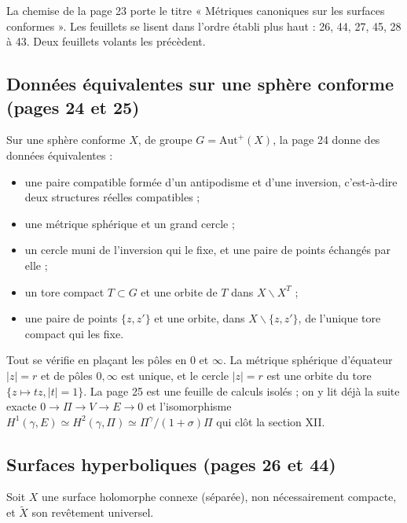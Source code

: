 \documentclass[11pt,a4paper]{article}
\begin{document}
La chemise de la page 23 porte le titre « Métriques canoniques sur les
surfaces conformes ». Les feuillets se lisent dans l'ordre établi plus haut :
26, 44, 27, 45, 28 à 43. Deux feuillets volants les précèdent.

\subsection*{Données équivalentes sur une sphère conforme (pages 24 et 25)}

Sur une sphère conforme $X$, de groupe $G = \mathrm{Aut}^{+}(X)$, la page 24
donne des données équivalentes :

\begin{itemize}
  \item[a)] une paire compatible formée d'un antipodisme et d'une
  inversion, c'est-à-dire deux structures réelles compatibles ;
  \item[b)] une métrique sphérique et un grand cercle ;
  \item[c)] un cercle muni de l'inversion qui le fixe, et une paire de points
  échangés par elle ;
  \item[d)] un tore compact $T \subset G$ et une orbite de $T$ dans
  $X \smallsetminus X^{T}$ ;
  \item[d')] une paire de points $\{z, z'\}$ et une orbite, dans
  $X \smallsetminus \{z,z'\}$, de l'unique tore compact qui les fixe.
\end{itemize}

Tout se vérifie en plaçant les pôles en $0$ et $\infty$. La métrique
sphérique d'équateur $|z| = r$ et de pôles $0, \infty$ est unique, et le
cercle $|z| = r$ est une orbite du tore $\{z \mapsto tz, |t| = 1\}$. La
page 25 est une feuille de calculs isolés ; on y lit déjà la suite exacte
$0 \to \Pi \to V \to E \to 0$ et l'isomorphisme
$H^{1}(\gamma, E) \simeq H^{2}(\gamma, \Pi) \simeq \Pi^{\gamma}/(1 +
\sigma)\Pi$ qui clôt la section XII.

\subsection*{Surfaces hyperboliques (pages 26 et 44)}

Soit $X$ une surface holomorphe connexe (séparée), non nécessairement
compacte, et $\widetilde{X}$ son revêtement universel.
\end{document}
